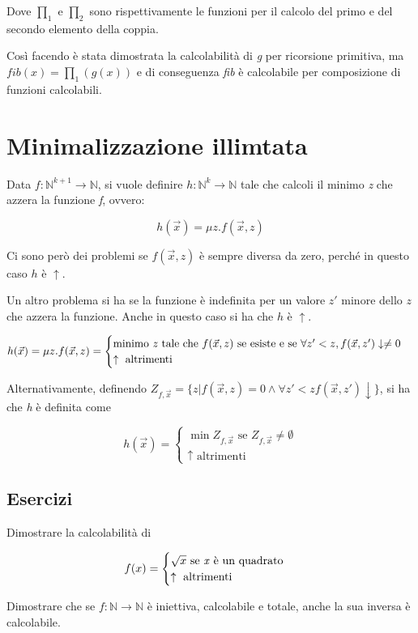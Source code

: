 Dove $\prod_1$ e $\prod_2$ sono rispettivamente le funzioni per il calcolo del primo e del secondo elemento della coppia.

Così facendo è stata dimostrata la calcolabilità di \textit{g} per ricorsione primitiva, ma $fib(x) = \prod_1(g(x))$ e di conseguenza \textit{fib} è calcolabile per composizione di funzioni calcolabili.

\section{Minimalizzazione illimtata}

Data $ f : \mathbb{N}^{k+1} \rightarrow \mathbb{N} $, si vuole definire $ h : \mathbb{N}^k \rightarrow \mathbb{N} $ tale che calcoli il minimo \textit{z} che azzera la funzione \textit{f}, ovvero:

$$
h(\vec{x}) = \mu z.f(\vec{x},z)
$$

Ci sono però dei problemi se $ f(\vec{x}, z) $ è sempre diversa da zero, perché in questo caso $ h $ è $ \uparrow $.

Un altro problema si ha se la funzione è indefinita per un valore $ z' $ minore dello $ z $ che azzera la funzione. Anche in questo caso si ha che $ h $ è $ \uparrow $.

$$
h(\vec{x}) = \mu z.f(\vec{x},z) = \begin{cases}
\text{minimo \textit{z} tale che } f(\vec{x},z) \text{ se esiste e se } \forall z' < z, f(\vec{x},z')\downarrow \neq 0 \\
\uparrow \text{ altrimenti}
\end{cases}
$$

Alternativamente, definendo $ Z_{f, \vec{x}} = \{z | f(\vec{x},z) = 0 \wedge \forall z' < z f(\vec{x},z') \downarrow \} $, si ha che \textit{h} è definita come

$$
h(\vec{x}) = \begin{cases}
\min Z_{f,\vec{x}} \text{ se } Z_{f,\vec{x}} \neq \emptyset \\
\uparrow \text{ altrimenti}
\end{cases}
$$

\subsection{Esercizi}

Dimostrare la calcolabilità di 

$$
f(x) = \begin{cases}
\sqrt{x} \text{ se \textit{x} è un quadrato} \\
\uparrow \text{ altrimenti}
\end{cases}
$$

Dimostrare che se $ f : \mathbb{N} \rightarrow \mathbb{N} $ è iniettiva, calcolabile e totale, anche la sua inversa è calcolabile.








